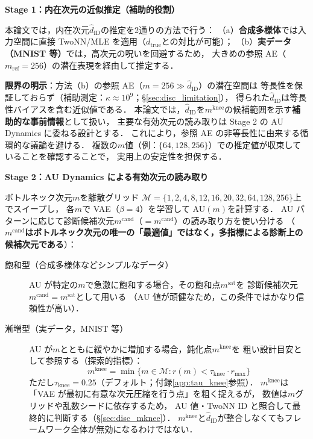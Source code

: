 \documentclass[11pt,a4paper]{jsarticle}
\newcommand{\dzopt}{m^{\mathrm{cand}}}
\newcommand{\dtrue}{d_{\mathrm{true}}}
\newcommand{\kap}{\kappa}
\newcommand{\dzsat}{m^{\mathrm{sat}}}
\newcommand{\mknee}{m^{\mathrm{knee}}}
\begin{document}
\textbf{Stage 1：内在次元の近似推定（補助的役割）}

本論文では，内在次元$\hat{d}_\mathrm{ID}$の推定を2通りの方法で行う：
（a）\textbf{合成多様体}では入力空間に直接 TwoNN/MLE を適用（$\dtrue$との対比が可能）；
（b）\textbf{実データ（MNIST 等）}では，高次元の呪いを回避するため，
大きめの参照 AE（$m_{\mathrm{ref}} = 256$）の潜在表現を経由して推定する．

\textbf{限界の明示}：方法（b）の参照 AE（$m = 256 \gg \hat{d}_\mathrm{ID}$）の潜在空間は
等長性を保証しておらず（補助測定：$\kap \approx 10^9$；§\ref{sec:disc_limitation}），
得られた$\hat{d}_\mathrm{ID}$は等長性バイアスを含む近似値である．
本論文では，$\hat{d}_\mathrm{ID}$を$\mknee$の候補範囲を示す\textbf{補助的な事前情報}として扱い，
主要な有効次元の読み取りは Stage 2 の AU Dynamics に委ねる設計とする．
これにより，参照 AE の非等長性に由来する循環的な議論を避ける．
複数の$m$値（例：$\{64, 128, 256\}$）での推定値が収束していることを確認することで，
実用上の安定性を担保する．

\textbf{Stage 2：AU Dynamics による有効次元の読み取り}

ボトルネック次元$m$を離散グリッド
$\mathcal{M} = \{1, 2, 4, 8, 12, 16, 20, 32, 64, 128, 256\}$上でスイープし，
各$m$で VAE（$\beta = 4$）を学習して AU$(m)$を計算する．
AU パターンに応じて診断候補次元$\dzopt$（$= m^{\mathrm{cand}}$）の読み取り方を使い分ける
（\textbf{$\dzopt$はボトルネック次元の唯一の「最適値」ではなく，多指標による診断上の候補次元である}）：

\begin{description}
  \item[飽和型（合成多様体などシンプルなデータ）]
        AU が特定の$m$で急激に飽和する場合，その飽和点$\dzsat$を
        診断候補次元$\dzopt = \dzsat$として用いる
        （AU 値が頑健なため，この条件ではかなり信頼性が高い）．
  \item[漸増型（実データ，MNIST 等）]
        AU が$m$とともに緩やかに増加する場合，鈍化点$\mknee$を
        粗い設計目安として参照する（探索的指標）：
        \begin{equation}
          \mknee = \min\{m \in \mathcal{M} : r(m) < \tau_{\mathrm{knee}} \cdot r_{\max}\}
          \label{eq:mknee}
        \end{equation}
        ただし$\tau_{\mathrm{knee}} = 0.25$（デフォルト；付録\ref{app:tau_knee}参照）．
        $\mknee$は「VAE が最初に有意な次元圧縮を行う点」を粗く捉えるが，
        数値は$m$グリッドや乱数シードに依存するため，
        AU 値・TwoNN ID と照合して最終的に判断する（§\ref{sec:disc_mknee}）．
        $\mknee$と$\hat{d}_\mathrm{ID}$が整合しなくてもフレームワーク全体が無効になるわけではない．
\end{description}
\end{document}
